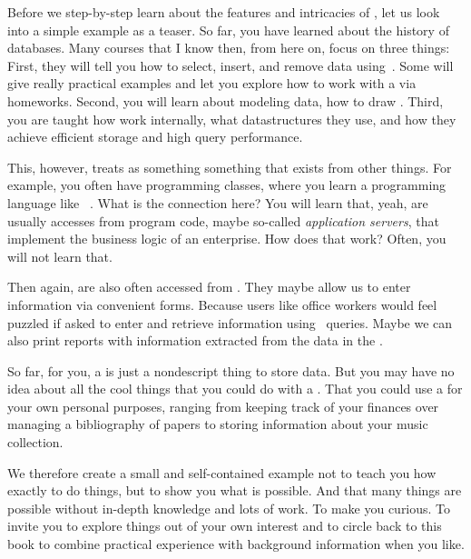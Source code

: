 Before we step-by-step learn about the features and intricacies of , let us look into a simple example as a teaser.
So far, you have learned about the history of databases.
Many courses that I know then, from here on, focus on three things:
First, they will tell you how to select, insert, and remove data using~\sql.
Some will give really practical examples and let you explore how to work with a  via homeworks.
Second, you will learn about modeling data, how to draw .
Third, you are taught how  work internally, what datastructures they use, and how they achieve efficient storage and high query performance.

This, however, treats  as something  something that exists  from other things.
For example, you often have programming classes, where you learn a programming language like \python~\cite{programmingWithPython}.
What is the connection here?
You will learn that, yeah,  are usually accesses from program code, maybe so-called \emph{application servers}, that implement the business logic of an enterprise.
How does that work?
Often, you will not learn that.

Then again,  are also often accessed from .
They maybe allow us to enter information via convenient forms.
Because users like office workers would feel puzzled if asked to enter and retrieve information using \sql\ queries.
Maybe we can also print reports with information extracted from the data in the .

So far, for you, a  is just a nondescript thing to store data.
But you may have no idea about all the cool things that you could do with a .
That you could use a  for your own personal purposes, ranging from keeping track of your finances over managing a bibliography of papers to storing information about your music collection.

We therefore create a small and self-contained example not to teach you how exactly to do things, but to show you what is possible.
And that many things are possible without in-depth knowledge and lots of work.
To make you curious.
To invite you to explore things out of your own interest and to circle back to this book to combine practical experience with background information when you like.
